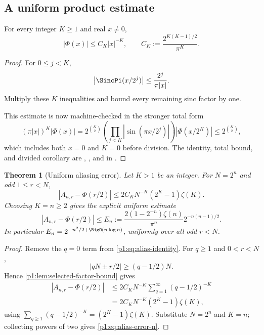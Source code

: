\documentclass[11pt,oneside]{article}
\newtheorem{theorem}{Theorem}[section]
\theoremstyle{definition}
\theoremstyle{remark}
\newcommand{\PhiU}{\Phi}
\begin{document}
\subsection{A uniform product estimate}

\begin{lemma}\label{p1:lem:selected-factor-bound}
For every integer $K\ge1$ and real $x\ne0$,
\begin{equation}\label{p1:eq:selected-factor-bound}
 |\PhiU(x)|\le C_K|x|^{-K},
 \qquad
 C_K:=\frac{2^{K(K-1)/2}}{\pi^K}.
\end{equation}
\end{lemma}

\begin{proof}
For $0\le j<K$,
\[
 \left|\SincPi(x/2^j)\right|
 \le\frac{2^j}{\pi|x|}.
\]
Multiply these $K$ inequalities and bound every remaining sinc factor by one.

\smallskip\noindent
This estimate is now machine-checked in the stronger total form
\[
 (\pi|x|)^K|\PhiU(x)|
 =2^{\binom K2}
  \left(\prod_{j<K}\left|\sin(\pi x/2^j)\right|\right)
  |\PhiU(x/2^K)|
 \le 2^{\binom K2},
\]
which includes both $x=0$ and $K=0$ before division.  The identity, total
bound, and divided corollary are
,
, and
 in
.
\end{proof}

\begin{theorem}[Uniform aliasing error]\label{p1:thm:alias-error}
Let $K>1$ be an integer.  For $N=2^n$ and odd $1\le r<N$,
\begin{equation}\label{p1:eq:alias-error-general}
 \boxed{
 |A_{n,r}-\PhiU(r/2)|
 \le 2C_KN^{-K}(2^K-1)\zeta(K).}
\end{equation}
Choosing $K=n\ge2$ gives the explicit uniform estimate
\begin{equation}\label{p1:eq:alias-error-n}
 \boxed{
 |A_{n,r}-\PhiU(r/2)|
 \le E_n:=
 \frac{2(1-2^{-n})\zeta(n)}{\pi^n}
 2^{-n(n-1)/2}.}
\end{equation}
In particular $E_n=2^{-n^2/2+\BigO(n\log n)}$, uniformly over all odd
$r<N$.
\end{theorem}

\begin{proof}
Remove the $q=0$ term from \eqref{p1:eq:alias-identity}.  For $q\ge1$ and
$0<r<N$,
\[
 |qN\pm r/2|\ge(q-1/2)N.
\]
Hence \cref{p1:lem:selected-factor-bound} gives
\begin{align*}
 |A_{n,r}-\PhiU(r/2)|
 &\le 2C_KN^{-K}\sum_{q=1}^{\infty}(q-1/2)^{-K}\\
 &=2C_KN^{-K}(2^K-1)\zeta(K),
\end{align*}
using
$\sum_{q\ge1}(q-1/2)^{-K}=(2^K-1)\zeta(K)$.
Substitute $N=2^n$ and $K=n$; collecting powers of two gives
\eqref{p1:eq:alias-error-n}.
\end{proof}
\end{document}
